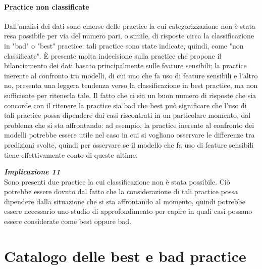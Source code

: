 \subsubsection{Practice non classificate}
Dall'analisi dei dati sono emerse delle practice la cui categorizzazione non è stata resa possibile per via del numero pari, o simile, di risposte circa la classificazione in "bad" o "best" practice: tali practice sono state indicate, quindi, come "non classificate". È presente molta indecisione sulla practice che propone il bilanciamento dei dati basato principalmente sulle feature sensibili; la practice inerente al confronto tra modelli, di cui uno che fa uso di feature sensibili e l'altro no, presenta una leggera tendenza verso la classificazione in best practice, ma non sufficiente per ritenerla tale. Il fatto che ci sia un buon numero di risposte che sia concorde con il ritenere la practice sia bad che best può significare che l'uso di tali practice possa dipendere dai casi riscontrati in un particolare momento, dal problema che si sta affrontando: ad esempio, la practice inerente al confronto dei modelli potrebbe essere utile nel caso in cui si vogliano osservare le differenze tra predizioni svolte, quindi per osservare se il modello che fa uso di feature sensibili tiene effettivamente conto di queste ultime.

\begin{center}
    \begin{tcolorbox}[width=400pt, colframe=black, colback=Gray!10]
			\begin{minipage}{\textwidth}
				\textit{\faCaretSquareORight  \textbf{ Implicazione 11}}\\
		     Sono presenti due practice la cui classificazione non è stata possibile. Ciò potrebbe essere dovuto dal fatto che la considerazione di tali practice possa dipendere dalla situazione che si sta affrontando al momento, quindi potrebbe essere necessario uno studio di approfondimento per capire in quali casi possano essere considerate come best oppure bad.
			\end{minipage}
	\end{tcolorbox}
\end{center}

\newpage

\chapter{Catalogo delle best e bad practice}

